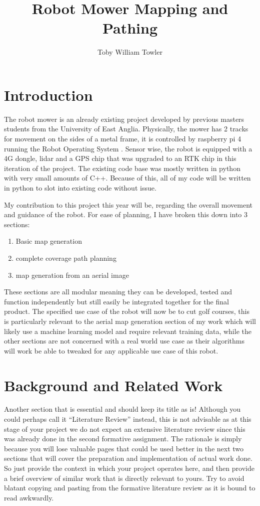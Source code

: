 \documentclass[final]{cmpreport_02}
\title{Robot Mower Mapping and Pathing}
\author{Toby William Towler}
\begin{document}
\section{Introduction}

The robot mower is an already existing project developed by previous masters students from the University of East Anglia.
Physically, the mower has 2 tracks for movement on the sides of a metal frame, it is controlled by raspberry pi 4 running the Robot Operating System \citep{doi:10.1126/scirobotics.abm6074}.
Sensor wise, the robot is equipped with a 4G dongle, lidar and a GPS chip that was upgraded to an RTK chip in this iteration of the project.
The existing code base was mostly written in python with very small amounts of C++.
Because of this, all of my code will be written in python to slot into existing code without issue.

My contribution to this project this year will be, regarding the overall movement and guidance of the robot.
For ease of planning, I have broken this down into 3 sections:
\begin{enumerate}
	\item Basic map generation
	\item complete coverage path planning
	\item map generation from an aerial image
\end{enumerate}

These sections are all modular meaning they can be developed, tested and function independently but still easily be integrated together for the final product.
The specified use case of the robot will now be to cut golf courses, this is particularly relevant to the aerial map generation section of my work which will likely use a machine learning model and require relevant training data, while the other sections are not concerned with a real world use case as their algorithms will work be able to tweaked for any applicable use case of this robot.





\section{Background and Related Work}

Another section that is essential and should keep its title as is! Although you could perhaps call it ``Literature Review'' instead, this is not advisable as at this stage of your project we do not expect an extensive literature review since this was already done in the second formative assignment. The rationale is simply because you will lose valuable pages that could be used better in the next two sections that will cover the preparation and implementation of actual work done. So just provide the context in which your project operates here, and then provide a brief overview of similar work that is directly relevant to yours. Try to avoid blatant copying and pasting from the formative literature review as it is bound to read awkwardly.
\end{document}
